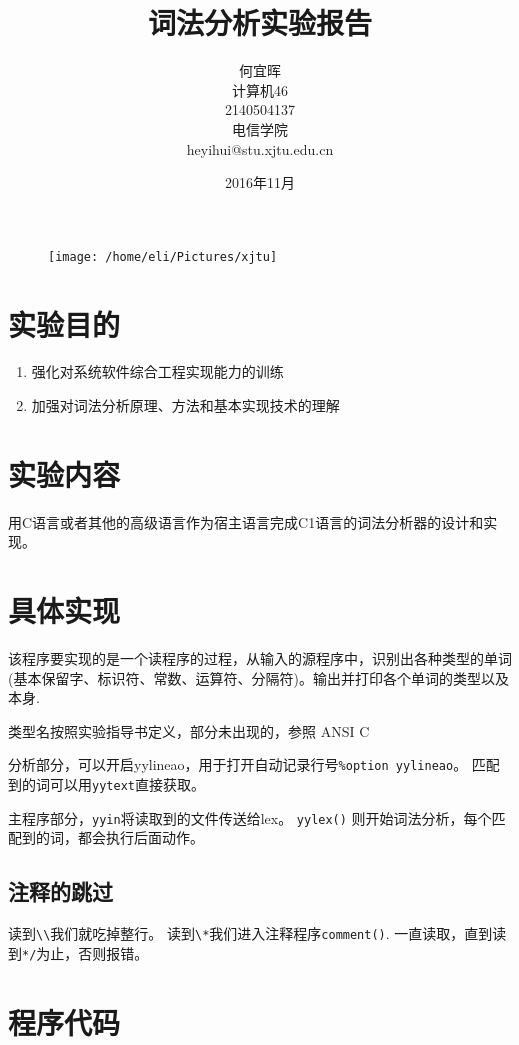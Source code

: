\documentclass{article}
\date{2016年11月}
\title{词法分析实验报告}
\author{何宜晖\\计算机46\\2140504137\\电信学院\\heyihui@stu.xjtu.edu.cn}
\begin{document}
\begin{CJK}{UTF8}{gkai}
\begin{figure}
\centering
\texttt{[image: /home/eli/Pictures/xjtu]}
\end{figure}


\maketitle
\clearpage
\section{实验目的}
\begin{enumerate}
	\item 强化对系统软件综合工程实现能力的训练
	\item 加强对词法分析原理、方法和基本实现技术的理解
\end{enumerate}

\section{实验内容}
用C语言或者其他的高级语言作为宿主语言完成C1语言的词法分析器的设计和实现。
\section{具体实现}
该程序要实现的是一个读程序的过程，从输入的源程序中，识别出各种类型的单词(基本保留字、标识符、常数、运算符、分隔符)。输出并打印各个单词的类型以及本身.\cite{chen2000} \cite{appel2004modern} 

类型名按照实验指导书定义，部分未出现的，参照 ANSI C \cite{ansic}

分析部分，可以开启yylineao，用于打开自动记录行号\verb|%option yylineao|。
匹配到的词可以用\verb|yytext|直接获取。

主程序部分，\verb|yyin|将读取到的文件传送给lex。 \verb|yylex()| 则开始词法分析，每个匹配到的词，都会执行后面动作。\cite{levine1992lex}\cite{lesk1975lex}
\subsection{注释的跳过}
读到\verb|\\|我们就吃掉整行。
读到\verb|\*|我们进入注释程序\verb|comment()|. 一直读取，直到读到\verb|*/|为止，否则报错。

\section{程序代码}



\end{CJK}
\end{document}
